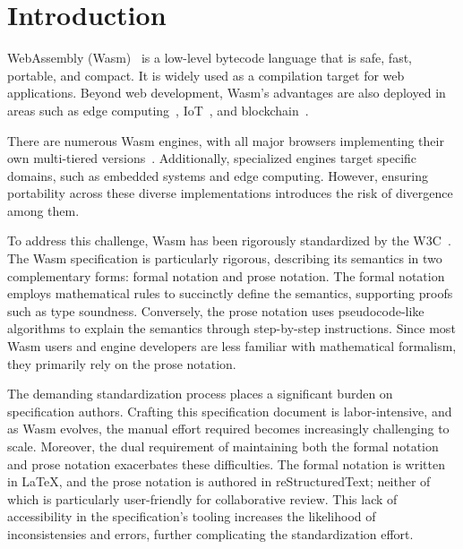 
\chapter{Introduction}
\label{ch:intro}
\noindent

WebAssembly (Wasm)~\cite{wasm} is a low-level bytecode language that is safe, fast,
portable, and compact.
It is widely used as a compilation target for web applications.
Beyond web development, Wasm's advantages are also deployed in areas such as
edge computing~\cite{wasm-edge}, IoT~\cite{wasm-iot}, and
blockchain~\cite{wasm-block}.


There are numerous Wasm engines, with all major browsers implementing their own
multi-tiered versions~\cite{v8, spidermonkey, webkit}.
Additionally, specialized engines target specific domains, such as embedded
systems and edge computing.
However, ensuring portability across these diverse implementations introduces
the risk of divergence among them.


To address this challenge, Wasm has been rigorously standardized by the
W3C~\cite{wasm-w3c}.
The Wasm specification is particularly rigorous, describing its semantics in
two complementary forms: formal notation and prose notation.
The formal notation employs mathematical rules to succinctly define the
semantics, supporting proofs such as type soundness.
Conversely, the prose notation uses pseudocode-like algorithms to explain the
semantics through step-by-step instructions.
Since most Wasm users and engine developers are less familiar with mathematical
formalism, they primarily rely on the prose notation.


The demanding standardization process places a significant burden on
specification authors.
Crafting this specification document is labor-intensive, and as Wasm evolves,
the manual effort required becomes increasingly challenging to scale.
Moreover, the dual requirement of maintaining both the formal notation and
prose notation exacerbates these difficulties.
The formal notation is written in LaTeX, and the prose notation is authored
in reStructuredText; neither of which is particularly user-friendly for
collaborative review.
This lack of accessibility in the specification's tooling increases the
likelihood of inconsistensies and errors, further complicating the
standardization effort.


